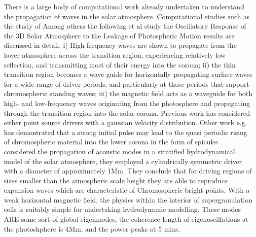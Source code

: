 \documentclass[authoryear,final,1p]{elsarticle}
\begin{document}
There is a large body of computational work already undertaken to understand the propagation of waves in the solar atmosphere. Computational studies such as the study of Among others the following \citet{Fedun2009} et al study the Oscillatory Response of the 3D Solar Atmosphere to the Leakage of Photospheric Motion results are discussed in detail: i) High-frequency waves are shown to propagate from the lower atmosphere across the transition region, experiencing relatively low reflection, and transmitting most of their energy into the corona; ii) the thin transition region becomes a wave guide for horizontally propagating surface waves for a wide range of driver periods, and particularly at those periods that support chromospheric standing waves; iii) the magnetic field acts as a waveguide for both high- and low-frequency waves originating from the photosphere and propagating through the transition region into the solar corona. Previous work has considered either point source drivers with a gaussian velocity distribution. Other work e.g.  \citet{Murawski2010} has demontrated that a strong initial pulse may lead to the quasi periodic rising of chromospheric material into the lower corona in the form of spicules \citet{Khomenko2012}. \citet{Kalkofen2010} considered the propagation of acoustic modes in a stratified hydrodynamical model of the solar atmosphere, they employed a cylindrically symmetric driver with a diameter of approximately 1Mm. They conclude that for driving regions of sizes smaller than the atmospheric scale height they are able to reproduce expansion waves which are characteristic of Chromospheric bright points. With a weak horizontal magnetic field, the physics within the interior of supergranulation cells \citet{Lites2008} is suitably simple for undertaking hydrodynamic modelling. These modes ARE some sort of global eigenmodes, the coherence length of eigenoscillations at the photoshphere is 4Mm, and the power peaks at 5 mins. 



\end{document}
